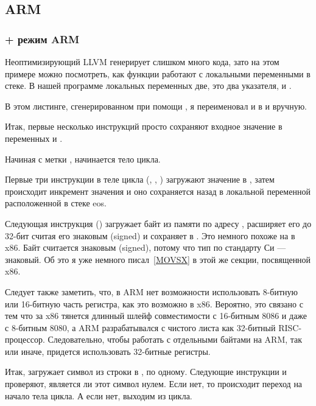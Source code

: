 ﻿\subsection{ARM}

\subsubsection{\NonOptimizingXcode + режим ARM}



Неоптимизирующий LLVM генерирует слишком много кода, зато на этом примере можно посмотреть, как функции работают
с локальными переменными в стеке. В нашей программе локальных переменных две, это два указателя,  и .

В этом листинге, сгенерированном при помощи \IDA, я переименовал  и  в  и  вручную.

Итак, первые несколько инструкций просто сохраняют входное значение в переменных  и .

Начиная с метки , начинается тело цикла.

Первые три инструкции в теле цикла (, \ADD, ) загружают значение  в , 
затем происходит инкремент значения и оно
сохраняется назад в локальной переменной расположенной в стеке eos.

Следующая инструкция  () загружает байт из памяти по адресу ,
расширяет его до 32-бит считая его знаковым (signed) и сохраняет в . Это немного похоже на \MOVSX в x86.
Байт считается знаковым (signed), потому что тип \Tchar по стандарту Си --- знаковый.
Об это я уже немного писал~\ref{MOVSX} в этой же секции, посвященной x86.

Следует также заметить, что, в ARM нет возможности использовать 8-битную или 16-битную часть регистра, как это возможно
в x86. 
Вероятно, это связано с тем что за x86 тянется длинный шлейф совместимости с 16-битным 8086 и даже с 8-битным 8080, а ARM
разрабатывался с чистого листа как 32-битный RISC-процессор. 
Следовательно, чтобы работать с отдельными байтами на ARM, так или иначе, придется использовать 32-битные регистры.

Итак,  загружает символ из строки в , по одному. 
Следующие инструкции \CMP и  проверяют, является ли этот символ нулем.
Если нет, то происходит переход на начало тела цикла. А если нет, выходим из цикла.

